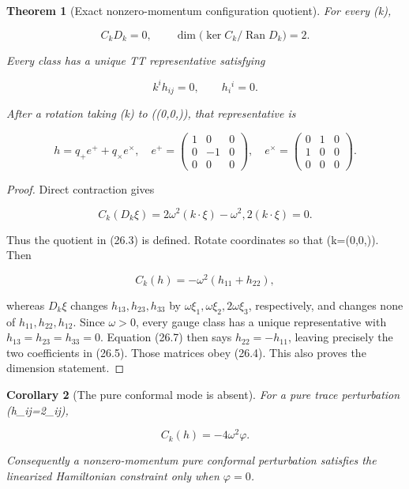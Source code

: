 \documentclass[11pt]{article}
\newtheorem{theorem}{Theorem}[section]
\newtheorem{corollary}[theorem]{Corollary}
\theoremstyle{remark}
\begin{document}
\begin{theorem}[Exact nonzero-momentum configuration quotient]
\label{thm:v19v23-config}
For every (k),

\[
 C_kD_k=0,
 \qquad
 \dim\bigl(\ker C_k/\operatorname{Ran}D_k\bigr)=2.             \tag{26.3}
\]

Every class has a unique TT representative satisfying

\[
 k^ih_{ij}=0,
 \qquad h_i{}^i=0.                                            \tag{26.4}
\]

After a rotation taking (k) to ((0,0,\omega)), that representative is

\[
 h=q_+e^++q_\times e^\times,
 \quad
 e^+=\begin{pmatrix}1&0&0\\0&-1&0\\0&0&0\end{pmatrix},
 \quad
 e^\times=\begin{pmatrix}0&1&0\\1&0&0\\0&0&0\end{pmatrix}. \tag{26.5}
\]
\end{theorem}

\begin{proof}
Direct contraction gives

\[
 C_k(D_k\xi)
 =2\omega^2(k\cdot\xi)-\omega^2,2(k\cdot\xi)=0.             \tag{26.6}
\]

Thus the quotient in (26.3) is defined.  Rotate coordinates so that
(k=(0,0,\omega)).  Then

\[
 C_k(h)=-\omega^2(h_{11}+h_{22}),                              \tag{26.7}
\]

whereas \(D_k\xi\) changes \(h_{13},h_{23},h_{33}\) by
\(\omega\xi_1,\omega\xi_2,2\omega\xi_3\), respectively, and changes
none of \(h_{11},h_{22},h_{12}\).  Since \(\omega>0\), every gauge class
has a unique representative with
\(h_{13}=h_{23}=h_{33}=0\).  Equation (26.7) then says
\(h_{22}=-h_{11}\), leaving precisely the two coefficients in (26.5).
Those matrices obey (26.4).  This also proves the dimension statement.
\end{proof}

\begin{corollary}[The pure conformal mode is absent]
\label{cor:v19v23-conformal}
For a pure trace perturbation (h_{ij}=2\varphi\delta_{ij}),

\[
 C_k(h)=-4\omega^2\varphi.                                    \tag{26.8}
\]

Consequently a nonzero-momentum pure conformal perturbation satisfies the
linearized Hamiltonian constraint only when \(\varphi=0\).
\end{corollary}
\end{document}
